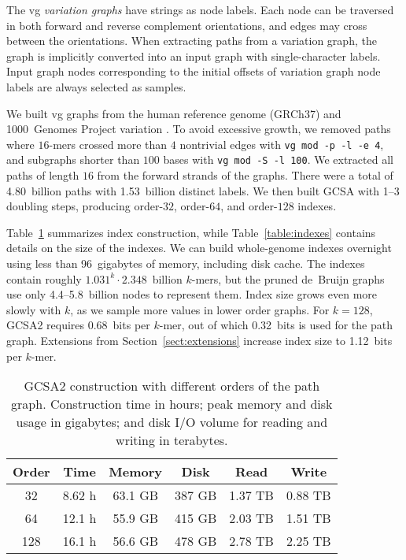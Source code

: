 \documentclass[a4paper,UKenglish]{lipics-v2016}
\newcommand{\kmer}[1]{$#1$\nobreakdash-mer}
\newcommand{\orderk}[1]{order\nobreakdash-$#1$}
\begin{document}
The vg \emph{variation graphs} have strings as node labels. Each node can be traversed in both forward and reverse complement orientations, and edges may cross between the orientations. When extracting paths from a variation graph, the graph is implicitly converted into an input graph with single-character labels. Input graph nodes corresponding to the initial offsets of variation graph node labels are always selected as samples.

We built vg graphs from the human reference genome (GRCh37) and 1000~Genomes Project variation \cite{1000GP2015}. To avoid excessive growth, we removed paths where \kmer{16}s crossed more than $4$ nontrivial edges with \texttt{vg mod -p -l -e 4}, and subgraphs shorter than $100$ bases with \texttt{vg mod -S -l 100}. We extracted all paths of length $16$ from the forward strands of the graphs. There were a total of 4.80~billion paths with 1.53~billion distinct labels. We then built GCSA with 1\nobreakdash--3 doubling steps, producing \orderk{32}, \orderk{64}, and \orderk{128} indexes.

Table~\ref{table:construction} summarizes index construction, while Table~\ref{table:indexes} contains details on the size of the indexes. We can build whole-genome indexes overnight using less than 96~gigabytes of memory, including disk cache. The indexes contain roughly $1.031^{k} \cdot 2.348$~billion \kmer{k}s, but the pruned de~Bruijn graphs use only 4.4\nobreakdash--5.8~billion nodes to represent them. Index size grows even more slowly with $k$, as we sample more values in lower order graphs. For $k = 128$, GCSA2 requires 0.68~bits per \kmer{k}, out of which 0.32~bits is used for the path graph. Extensions from Section~\ref{sect:extensions} increase index size to 1.12~bits per \kmer{k}.

\begin{table}[t!]
\begin{center}
\caption{GCSA2 construction with different orders of the path graph. Construction time in hours; peak memory and disk usage in gigabytes; and disk I/O volume for reading and writing in terabytes.}\label{table:construction}
\begin{tabular}{c|ccc|cc}
\hline
\textbf{Order} & \textbf{Time} & \textbf{Memory} & \textbf{Disk} & \textbf{Read} & \textbf{Write} \\
\hline
 32 & 8.62 h & 63.1 GB & 387 GB & 1.37 TB & 0.88 TB \\
 64 & 12.1 h & 55.9 GB & 415 GB & 2.03 TB & 1.51 TB \\
128 & 16.1 h & 56.6 GB & 478 GB & 2.78 TB & 2.25 TB \\
\hline
\end{tabular}
\end{center}
\end{table}
\end{document}
